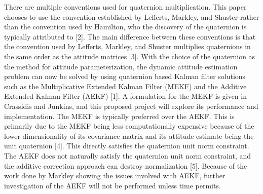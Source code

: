 \documentclass[12pt]{report}
\begin{document}
\noindent There are multiple conventions used for quaternion multiplication. This paper chooses to use the convention established by Lefferts, Markley, and Shuster rather than the convention used by Hamilton, who the discovery of the quaternion is typically attributed to [2]. The main difference between these conventions is that the convention used by Lefferts, Markley, and Shuster multiplies quaternions in the same order as the attitude matrices [3]. With the choice of the quaternion as the method for attitude parameterization, the dynamic attitude estimation problem can now be solved by using quaternion based Kalman filter solutions such as the Multiplicative Extended Kalman Filter (MEKF) and the Additive Extended Kalman Filter (AEKF) [1]. A formulation for the MEKF is given in Crassidis and Junkins, and this proposed project will explore its performance and implementation. The MEKF is typically preferred over the AEKF. This is primarily due to the MEKF being less computationally expensive because of the lower dimensionality of its covariance matrix and its attitude estimate being the unit quaternion [4]. This directly satisfies the quaternion unit norm constraint. The AEKF does not naturally satisfy the quaternion unit norm constraint, and the additive correction approach can destroy normalization [5]. Because of the work done by Markley showing the issues involved with AEKF, further investigation of the AEKF will not be performed unless time permits.\\ %
\end{document}
